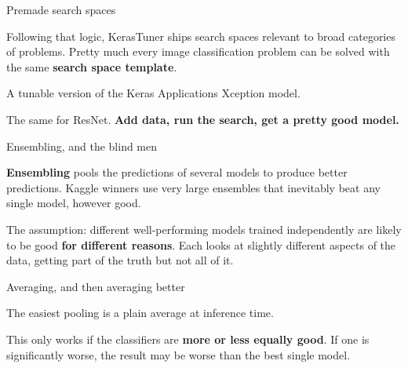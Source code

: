 \documentclass[aspectratio=169,11pt,t]{beamer}
\begin{document}
\begin{frame}[shrink=25]{Premade search spaces}
{\fontsize{9.4}{12.6}\selectfont\color{fg2}Following that logic, KerasTuner ships search spaces relevant to broad categories of problems. Pretty much every image classification problem can be solved with the same \textbf{search space template}.\par}\vskip 4pt
\begin{minipage}[t]{0.494\textwidth}
\begin{icardaccent}
A tunable version of the Keras Applications Xception model.
\end{icardaccent}
\end{minipage}%
\hfill
\begin{minipage}[t]{0.494\textwidth}
\begin{icardaccent}
The same for ResNet. \textbf{Add data, run the search, get a pretty good model.}
\end{icardaccent}
\end{minipage}%
\end{frame}

\begin{frame}[shrink=25]{Ensembling, and the blind men}
{\fontsize{9.4}{12.6}\selectfont\color{fg2}\textbf{Ensembling} pools the predictions of several models to produce better predictions. Kaggle winners use very large ensembles that inevitably beat any single model, however good.\par}\vskip 4pt
{\fontsize{9.4}{12.6}\selectfont\color{fg2}The assumption: different well-performing models trained independently are likely to be good \textbf{for different reasons}. Each looks at slightly different aspects of the data, getting part of the truth but not all of it.\par}\vskip 4pt
\begin{iquote}
\end{iquote}
\end{frame}

\begin{frame}[shrink=25]{Averaging, and then averaging better}
{\fontsize{9.4}{12.6}\selectfont\color{fg2}The easiest pooling is a plain average at inference time.\par}\vskip 4pt
{\fontsize{9.4}{12.6}\selectfont\color{fg2}This only works if the classifiers are \textbf{more or less equally good}. If one is significantly worse, the result may be worse than the best single model.\par}\vskip 4pt
\end{frame}
\end{document}
